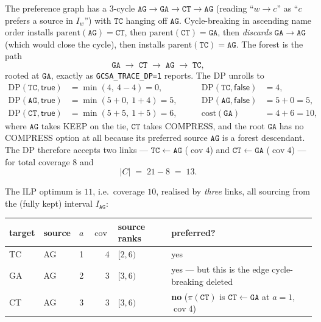 \documentclass[11pt,a4paper]{article}
\theoremstyle{definition}
\theoremstyle{plain}
\theoremstyle{remark}
\newcommand{\cov}{\operatorname{cov}}
\begin{document}
The preference graph has a $3$-cycle
$\mathtt{AG} \to \mathtt{GA} \to \mathtt{CT} \to \mathtt{AG}$
(reading ``$w \to c$'' as ``$c$ prefers a source in $I_w$'') with
$\mathtt{TC}$ hanging off $\mathtt{AG}$. Cycle-breaking in ascending name
order installs $\mathrm{parent}(\mathtt{AG}) = \mathtt{CT}$, then
$\mathrm{parent}(\mathtt{CT}) = \mathtt{GA}$, then \emph{discards}
$\mathtt{GA} \to \mathtt{AG}$ (which would close the cycle), then
installs $\mathrm{parent}(\mathtt{TC}) = \mathtt{AG}$. The forest is the
path
\[
  \mathtt{GA} \;\to\; \mathtt{CT} \;\to\; \mathtt{AG} \;\to\; \mathtt{TC},
\]
rooted at $\mathtt{GA}$, exactly as \texttt{GCSA\_TRACE\_DP=1} reports.
The DP unrolls to
\[
\begin{aligned}
  \mathrm{DP}(\mathtt{TC},\mathsf{true}) &= \min(4,\ 4-4) = 0,
    &\qquad \mathrm{DP}(\mathtt{TC},\mathsf{false}) &= 4, \\
  \mathrm{DP}(\mathtt{AG},\mathsf{true}) &= \min(5+0,\ 1+4) = 5,
    &\qquad \mathrm{DP}(\mathtt{AG},\mathsf{false}) &= 5+0 = 5, \\
  \mathrm{DP}(\mathtt{CT},\mathsf{true}) &= \min(5+5,\ 1+5) = 6,
    &\qquad \mathrm{cost}(\mathtt{GA}) &= 4 + 6 = 10,
\end{aligned}
\]
where $\mathtt{AG}$ takes KEEP on the tie, $\mathtt{CT}$ takes COMPRESS,
and the root $\mathtt{GA}$ has no COMPRESS option at all because its
preferred source $\mathtt{AG}$ is a forest descendant. The DP therefore
accepts two links --- $\mathtt{TC}\!\leftarrow\!\mathtt{AG}$
($\cov 4$) and $\mathtt{CT}\!\leftarrow\!\mathtt{GA}$ ($\cov 4$) --- for
total coverage $8$ and
\[
  |C| \;=\; 21 - 8 \;=\; 13 .
\]

The ILP optimum is $11$, i.e.\ coverage $10$, realised by \emph{three}
links, all sourcing from the (fully kept) interval $I_{\mathtt{AG}}$:

\begin{center}
\small
\begin{tabular}{@{}llrrll@{}}
\toprule
target & source & $a$ & $\cov$ & source ranks & preferred? \\
\midrule
TC & AG & 1 & 4 & $[2,6)$ & yes \\
GA & AG & 2 & 3 & $[3,6)$ & yes --- but this is the edge cycle-breaking deleted \\
CT & AG & 3 & 3 & $[3,6)$ & \textbf{no} ($\pi(\mathtt{CT})$ is
  $\mathtt{CT}\!\leftarrow\!\mathtt{GA}$ at $a=1$, $\cov 4$) \\
\bottomrule
\end{tabular}
\end{center}
\end{document}

